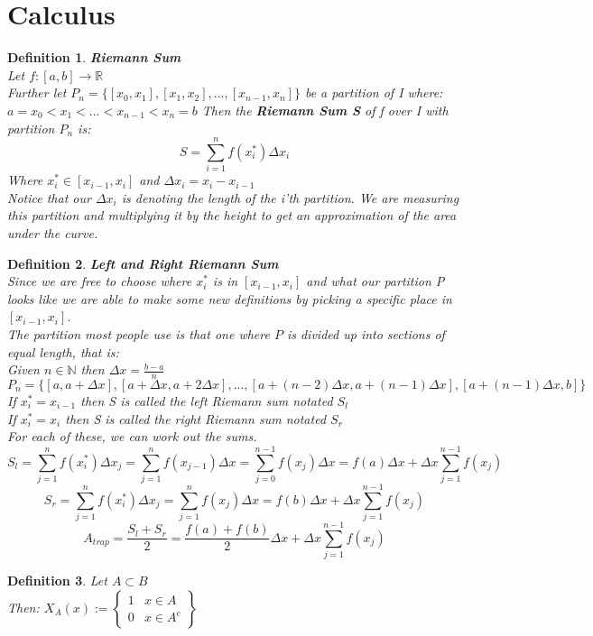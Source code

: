 \documentclass[12pt]{extarticle}
\theoremstyle{plain}
\theoremstyle{plain}
\theoremstyle{plain}
\theoremstyle{Definition}
\newtheorem{def.}{Definition}[section]
\theoremstyle{Definition}
\theoremstyle{plain}
\theoremstyle{plain}
\begin{document}
\section{Calculus}
\begin{def.} \textbf{Riemann Sum} \\
	Let $f : [a,b] \to \mathbb{R}$ \\
	Further let $P_n = \{[x_0,x_1],[x_1,x_2],...,[x_{n-1},x_n]\}$ be a partition of I where: $a = x_0 < x_1 < ... < x_{n-1} < x_n = b$ 
	Then the \textbf{Riemann Sum S} of f over I with partition $P_n$ is: \\ 
	$$S = \sum_{i=1}^{n} f(x_i^*) \Delta x_i$$
	Where $x_i^* \in [x_{i-1}, x_i]$ and $\Delta x_i = x_i - x_{i-1}$  \\
	Notice that our $\Delta x_i$ is denoting the length of the i'th partition. 
	We are measuring this partition and multiplying it by the height to get an approximation of the area under the curve.
\end{def.}
\begin{def.}\textbf{Left and Right Riemann Sum} \\ 
	Since we are free to choose where $x_i^*$ is in $[x_{i-1},x_i]$ and what our partition P looks like we are able to make some new definitions by picking a specific place in $[x_{i-1},x_i]$. \\ 
	The partition most people use is that one where $P$ is divided up into sections of equal length, that is: \\ 
	Given $n \in \mathbb{N}$ then $\Delta x = \frac{b - a}{n}$ \\ 
	$P_n = \{[a,a+\Delta x],[a+\Delta x,a+2\Delta x],...,[a+(n-2)\Delta x,a+(n-1)\Delta x],[a+(n-1)\Delta x,b]\}$ \\
	If $x_i^* = x_{i-1}$ then S is called the left Riemann sum notated $S_l$ \\ 
	If $x_i^* = x_i$ then S is called the right Riemann sum notated $S_r$ \\ 
	For each of these, we can work out the sums. \\ 
	$$S_l = \sum_{j=1}^{n}f(x_i^*)\Delta x_j = \sum_{j=1}^{n}f(x_{j-1})\Delta x = \sum_{j=0}^{n-1}f(x_{j})\Delta x = f(a)\Delta x + \Delta x\sum_{j=1}^{n-1}f(x_{j})$$
	$$S_r = \sum_{j=1}^{n}f(x_i^*)\Delta x_j = \sum_{j=1}^{n}f(x_{j})\Delta x = f(b)\Delta x + \Delta x\sum_{j=1}^{n-1}f(x_{j})$$
	$$A_{trap} = \frac{S_l + S_r}{2} = \frac{f(a)+f(b)}{2}\Delta x +\Delta x\sum_{j=1}^{n-1}f(x_{j})$$
\end{def.}
\begin{def.}
	Let $A \subset B$ \\ 
	Then: $X_A(x) := \begin{Bmatrix}
	1 & x \in A \\ 
	0 & x \in A^c 
	\end{Bmatrix}$
\end{def.}
\end{document}
